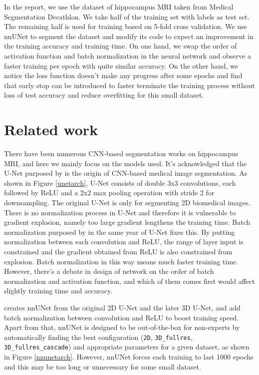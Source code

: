 \documentclass{article}
\begin{document}
In the report, we use the dataset of hippocampus MRI taken from Medical Segmentation Decathlon. We take half of the training set with labels as test set. The remaining half is used for training based on 5-fold cross validation. We use nnUNet to segment the dataset and modify its code to expect an improvement in the training accuracy and training time. On one hand, we swap the order of activation function and batch normalization in the neural network and observe a faster training per epoch with quite similar accuracy. On the other hand, we notice the loss function doesn't make any progress after some epochs and find that early stop can be introduced to faster terminate the training process without loss of test accuracy and reduce overfitting for this small dataset.

\section{Related work}

There have been numerous CNN-based segmentation works on hippocampus MRI, and here we mainly focus on the models used. It's acknowledged that the U-Net purposed by \citet{ronneberger2015u} is the origin of CNN-based medical image segmentation. As shown in Figure \ref{unetarch}, U-Net consists of double 3x3 convolutions, each followed by ReLU and a 2x2 max pooling operation with stride 2 for downsampling. The original U-Net is only for segmenting 2D biomedical images. There is no normalization process in U-Net and therefore it is vulnerable to gradient explosion, namely too large gradient lengthens the training time. Batch normalization purposed by \citet{ioffe2015batch} in the same year of U-Net fixes this. By putting normalization between each convolution and ReLU, the range of layer input is constrained and the gradient obtained from ReLU is also constrained from explosion. Batch normalization in this way means much faster training time. However, there's a debate in design of network on the order of batch normalization and activation function, and which of them comes first would affect slightly training time and accuracy.

\citet{isensee2021nnu} creates nnUNet from the original 2D U-Net and the later 3D U-Net, and add batch normalization between convolution and ReLU to boost training speed. Apart from that, nnUNet is designed to be out-of-the-box for non-experts by automatically finding the best configuration (\texttt{2D}, \texttt{3D\_fullres}, \texttt{3D\_fullres\_cascade}) and appropriate parameters for a given dataset, as shown in Figure \ref{nnunetarch}. However, nnUNet forces each training to last 1000 epochs and this may be too long or unnecessary for some small dataset.
\end{document}

